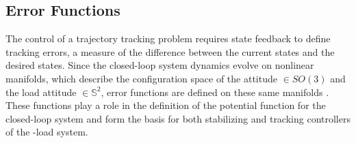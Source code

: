 \subsection{Error Functions}\label{sec:con.configerr}


%
The control of a trajectory tracking problem requires state feedback to define tracking errors, a measure of the difference between the current states and the desired states.
Since the closed-loop system dynamics evolve on nonlinear manifolds, which describe the configuration space of the  attitude $ \in SO(3) $ and the load attitude $ \in \mathbb{S}^2 $, 
error functions are defined on these same manifolds \cite{Bullo2005}. 
These functions play a role in the definition of the potential function for the closed-loop system and form the basis for both stabilizing and tracking controllers of the -load system.
